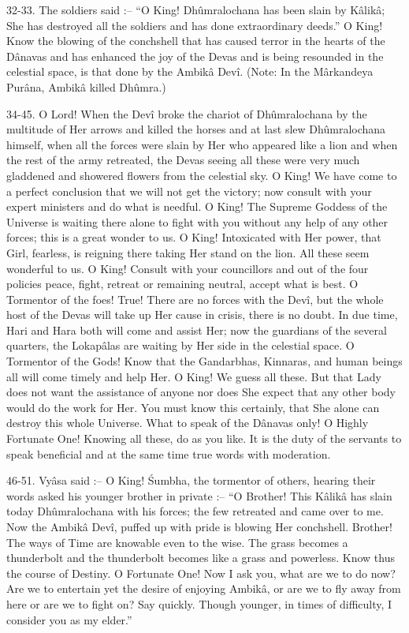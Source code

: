 32-33. The soldiers said :-- ``O King! Dh\^umralochana has been slain by K\^alik\^a; She has destroyed all the soldiers and has done extraordinary deeds.'' O King! Know the blowing of the conchshell that has caused terror in the hearts of the D\^anavas and has enhanced the joy of the Devas and is being resounded in the celestial space, is that done by the Ambik\^a Dev\^i. (Note: In the M\^arkandeya Pur\^ana, Ambik\^a killed Dh\^umra.)

34-45. O Lord! When the Dev\^i broke the chariot of Dh\^umralochana by the multitude of Her arrows and killed the horses and at last slew Dh\^umralochana himself, when all the forces were slain by Her who appeared like a lion and when the rest of the army retreated, the Devas seeing all these were very much gladdened and showered flowers from the celestial sky. O King! We have come to a perfect conclusion that we will not get the victory; now consult with your expert ministers and do what is needful. O King! The Supreme Goddess of the Universe is waiting there alone to fight with you without any help of any other forces; this is a great wonder to us. O King! Intoxicated with Her power, that Girl, fearless, is reigning there taking Her stand on the lion. All these seem wonderful to us. O King! Consult with your councillors and out of the four policies peace, fight, retreat or remaining neutral, accept what is best. O Tormentor of the foes! True! There are no forces with the Dev\^i, but the whole host of the Devas will take up Her cause in crisis, there is no doubt. In due time, Hari and Hara both will come and assist Her; now the guardians of the several quarters, the Lokap\^alas are waiting by Her side in the celestial space. O Tormentor of the Gods! Know that the Gandarbhas, Kinnaras, and human beings all will come timely and help Her. O King! We guess all these. But that Lady does not want the assistance of anyone nor does She expect that any other body would do the work for Her. You must know this certainly, that She alone can destroy this whole Universe. What to speak of the D\^anavas only! O Highly Fortunate One! Knowing all these, do as you like. It is the duty of the servants to speak beneficial and at the same time true words with moderation.

46-51. Vy\^asa said :-- O King! \'Sumbha, the tormentor of others, hearing their words asked his younger brother in private :-- ``O Brother! This K\^alik\^a has slain today Dh\^umralochana with his forces; the few retreated and came over to me. Now the Ambik\^a Dev\^i, puffed up with pride is blowing Her conchshell. Brother! The ways of Time are knowable even to the wise. The grass becomes a thunderbolt and the thunderbolt becomes like a grass and powerless. Know thus the course of Destiny. O Fortunate One! Now I ask you, what are we to do now? Are we to entertain yet the desire of enjoying Ambik\^a, or are we to fly away from here or are we to fight on? Say quickly. Though younger, in times of difficulty, I consider you as my elder.''

